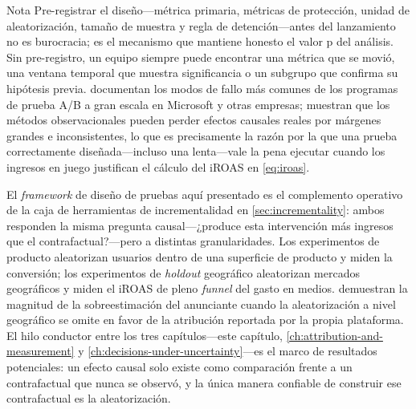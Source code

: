\begin{admonition}{Nota}
Pre-registrar el diseño---métrica primaria, métricas de protección, unidad de aleatorización,
tamaño de muestra y regla de detención---antes del lanzamiento no es burocracia; es el
mecanismo que mantiene honesto el valor p del análisis. Sin pre-registro, un equipo siempre
puede encontrar una métrica que se movió, una ventana temporal que muestra significancia o
un subgrupo que confirma su hipótesis previa. \textcite{kohavi2020trustworthy} documentan
los modos de fallo más comunes de los programas de prueba A/B a gran escala en Microsoft y
otras empresas; \textcite{gordon2019comparison} muestran que los métodos observacionales
pueden perder efectos causales reales por márgenes grandes e inconsistentes, lo que es
precisamente la razón por la que una prueba correctamente diseñada---incluso una lenta---vale
la pena ejecutar cuando los ingresos en juego justifican el cálculo del iROAS en \cref{eq:iroas}.
\end{admonition}

El \emph{framework} de diseño de pruebas aquí presentado es el complemento operativo de la
caja de herramientas de incrementalidad en \cref{sec:incrementality}: ambos responden la
misma pregunta causal---¿produce esta intervención más ingresos que el contrafactual?---pero
a distintas granularidades. Los experimentos de producto aleatorizan usuarios dentro de una
superficie de producto y miden la conversión; los experimentos de \emph{holdout} geográfico
aleatorizan mercados geográficos y miden el iROAS de pleno \emph{funnel} del gasto en
medios. \textcite{johnson2017ghost} demuestran la magnitud de la sobreestimación del anunciante
cuando la aleatorización a nivel geográfico se omite en favor de la atribución reportada por
la propia plataforma. El hilo conductor entre los tres capítulos---este capítulo,
\cref{ch:attribution-and-measurement} y \cref{ch:decisions-under-uncertainty}---es el marco
de resultados potenciales: un efecto causal solo existe como comparación frente a un
contrafactual que nunca se observó, y la única manera confiable de construir ese contrafactual
es la aleatorización.

